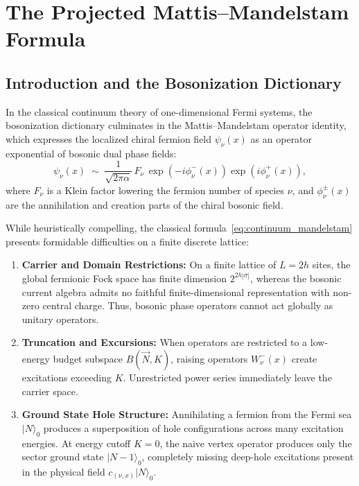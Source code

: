 \chapter{The Projected Mattis--Mandelstam Formula}
\label{ch:mandelstam}

\section{Introduction and the Bosonization Dictionary}

In the classical continuum theory of one-dimensional Fermi systems, the bosonization dictionary culminates in the Mattis--Mandelstam operator identity, which expresses the localized chiral fermion field $\psi_\nu(x)$ as an operator exponential of bosonic dual phase fields:
\begin{equation}
\label{eq:continuum_mandelstam}
\psi_\nu(x) \;\sim\; \frac{1}{\sqrt{2\pi \alpha}}\, F_\nu\, \exp\left( -i \phi_\nu^-(x) \right) \exp\left( i \phi_\nu^+(x) \right),
\end{equation}
where $F_\nu$ is a Klein factor lowering the fermion number of species $\nu$, and $\phi_\nu^\pm(x)$ are the annihilation and creation parts of the chiral bosonic field.

While heuristically compelling, the classical formula~\eqref{eq:continuum_mandelstam} presents formidable difficulties on a finite discrete lattice:
\begin{remark}
\begin{enumerate}
    \item \textbf{Carrier and Domain Restrictions:} On a finite lattice of $L = 2h$ sites, the global fermionic Fock space has finite dimension $2^{2h|\sigma|}$, whereas the bosonic current algebra admits no faithful finite-dimensional representation with non-zero central charge. Thus, bosonic phase operators cannot act globally as unitary operators.
    \item \textbf{Truncation and Excursions:} When operators are restricted to a low-energy budget subspace $B(\vec{N}, K)$, raising operators $W^-_\nu(x)$ create excitations exceeding $K$. Unrestricted power series immediately leave the carrier space.
    \item \textbf{Ground State Hole Structure:} Annihilating a fermion from the Fermi sea $|N\rangle_0$ produces a superposition of hole configurations across many excitation energies. At energy cutoff $K=0$, the naive vertex operator produces only the sector ground state $|N-1\rangle_0$, completely missing deep-hole excitations present in the physical field $c_{(\nu, x)} |N\rangle_0$.
\end{enumerate}
\end{remark}

